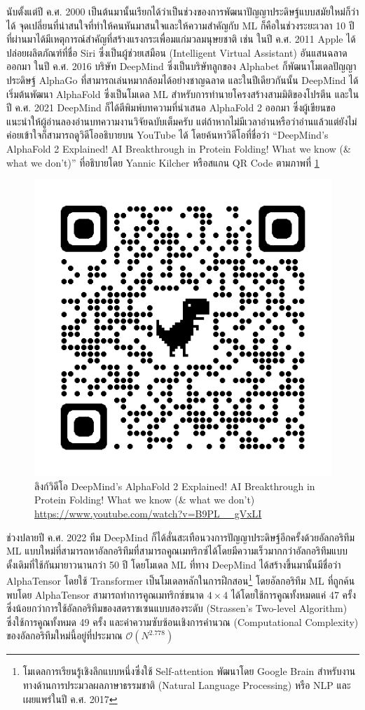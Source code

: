 นับตั้งแต่ปี ค.ศ. 2000 เป็นต้นมานั้นเรียกได้ว่าเป็นช่วงของการพัฒนาปัญญาประดิษฐ์แบบสมัยใหม่ก็ว่าได้ จุดเปลี่ยนที่น่าสนใจที่ทำให้คนหันมาสนใจและให้ความสำคัญกับ ML ก็คือในช่วงระยะเวลา 10 ปีที่ผ่านมาได้มีเหตุการณ์สำคัญที่สร้างแรงกระเพื่อมแก่มวลมนุษยชาติ เช่น ในปี ค.ศ. 2011 Apple ได้ปล่อยผลิตภัณฑ์ที่ชื่อ Siri ซึ่งเป็นผู้ช่วยเสมือน (Intelligent Virtual Assistant) อันแสนฉลาดออกมา ในปี ค.ศ. 2016 บริษัท DeepMind ซึ่งเป็นบริษัทลูกของ Alphabet ก็พัฒนาโมเดลปัญญาประดิษฐ์ AlphaGo ที่สามารถเล่นหมากล้อมได้อย่างชาญฉลาด และในปีเดียวกันนั้น DeepMind ได้เริ่มต้นพัฒนา AlphaFold ซึ่งเป็นโมเดล ML สำหรับการทำนายโครงสร้างสามมิติของโปรตีน และในปี ค.ศ. 2021 DeepMind ก็ได้ตีพิมพ์บทความที่นำเสนอ AlphaFold 2 ออกมา\autocite{jumper2021} ซึ่งผู้เขียนขอแนะนำให้ผู้อ่านลองอ่านบทความงานวิจัยฉบับเต็มครับ แต่ถ้าหากไม่มีเวลาอ่านหรือว่าอ่านแล้วแต่ยังไม่ค่อยเข้าใจก็สามารถดูวิดีโออธิบายบน YouTube ได้ โดยค้นหาวิดีโอที่ชื่อว่า \enquote{DeepMind's AlphaFold 2 Explained! AI Breakthrough in Protein Folding! What we know (\& what we don't)} ที่อธิบายโดย Yannic Kilcher หรือสแกน QR Code ตามภาพที่ \ref{fig:qr_code_alphafold}

\begin{figure}[H]
    \centering
    \includegraphics[width=0.3\linewidth]{fig/qr_code_alphafold2_explained.png}
    \caption{ลิงก์วิดีโอ DeepMind's AlphaFold 2 Explained! AI Breakthrough in Protein Folding! What we know 
    (\& what we don't) \url{https://www.youtube.com/watch?v=B9PL__gVxLI}}
    \label{fig:qr_code_alphafold}
\end{figure}

ช่วงปลายปี ค.ศ. 2022 ทีม DeepMind ก็ได้สั่นสะเทือนวงการปัญญาประดิษฐ์อีกครั้งด้วยอัลกอริทึม ML แบบใหม่ที่สามารถหาอัลกอริทึมที่สามารถคูณเมทริกซ์ได้โดยมีความเร็วมากกว่าอัลกอริทึมแบบดั้งเดิมที่ใช้กันมายาวนานกว่า 50 ปี โดยโมเดล ML ที่ทาง DeepMind ได้สร้างขึ้นมานั้นมีชื่อว่า AlphaTensor โดยใช้ Transformer\autocite{vaswani2017} เป็นโมเดลหลักในการฝึกสอน\footnote{โมเดลการเรียนรู้เชิงลึกแบบหนึ่งซึ่งใช้ Self-attention พัฒนาโดย Google Brain สำหรับงานทางด้านการประมวลผลภาษาธรรมชาติ (Natural Language Processing) หรือ NLP และเผยแพร่ในปี ค.ศ. 2017} โดยอัลกอริทึม ML ที่ถูกค้นพบโดย AlphaTensor สามารถทำการคูณเมทริกซ์ขนาด $4 \times 4$ ได้โดยใช้การคูณทั้งหมดแค่ 47 ครั้ง ซึ่งน้อยกว่าการใช้อัลกอริทึมของสตราซเซนแบบสองระดับ (Strassen's Two-level Algorithm) ซึ่งใช้การคูณทั้งหมด 49 ครั้ง\autocite{strassen1969}  และค่าความซับซ้อนเชิงการคำนวณ (Computational Complexity) ของอัลกอริทึมใหม่นี้อยู่ที่ประมาณ ${\mathcal{O}}({N}^{2.778})$ 

